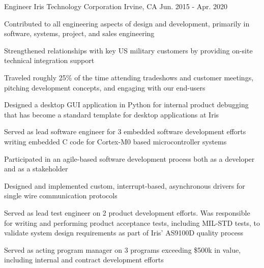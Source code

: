 \begin{cventries}
  \cventry
    {Engineer} %
    {Iris Technology Corporation} %
    {Irvine, CA} %
    {Jun. 2015 - Apr. 2020} %
    {
      \begin{cvitems} %
        \item {Contributed to all engineering aspects of design and development, primarily in software, systems, project, and sales engineering}
        \item {Strengthened relationships with key US military customers by providing on-site technical integration support}
        \item {Traveled roughly 25\% of the time attending tradeshows and customer meetings, pitching development concepts, and engaging with our end-users}
        \item {Designed a desktop GUI application in Python for internal product debugging that has become a standard template for desktop applications at Iris}
        \item {Served as lead software engineer for 3 embedded software development efforts writing embedded C code for Cortex-M0 based microcontroller systems}
        \item {Participated in an agile-based software development process both as a developer and as a stakeholder}
        \item {Designed and implemented custom, interrupt-based, asynchronous drivers for single wire communication protocols}
        \item {Served as lead test engineer on 2 product development efforts. Was responsible for writing and performing product acceptance tests, including MIL-STD tests, to validate system design requirements as part of Iris' AS9100D quality process}
        \item {Served as acting program manager on 3 programs exceeding \$500k in value, including internal and contract development efforts}
      \end{cvitems}
    }

\end{cventries}
